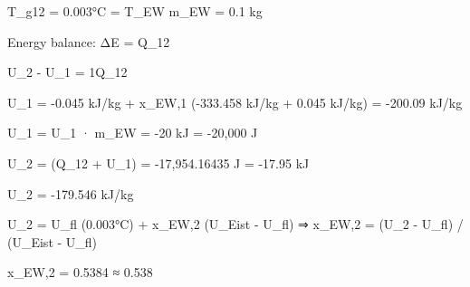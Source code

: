 T_g12 = 0.003°C = T_EW  
m_EW = 0.1 kg  

Energy balance:  
ΔE = Q_12  

U_2 - U_1 = 1Q_12  

U_1 = -0.045 kJ/kg + x_EW,1 (-333.458 kJ/kg + 0.045 kJ/kg) = -200.09 kJ/kg  

U_1 = U_1 · m_EW = -20 kJ = -20,000 J  

U_2 = (Q_12 + U_1) = -17,954.16435 J = -17.95 kJ  

U_2 = -179.546 kJ/kg  

U_2 = U_fl (0.003°C) + x_EW,2 (U_Eist - U_fl) ⇒ x_EW,2 = (U_2 - U_fl) / (U_Eist - U_fl)  

x_EW,2 = 0.5384 ≈ 0.538